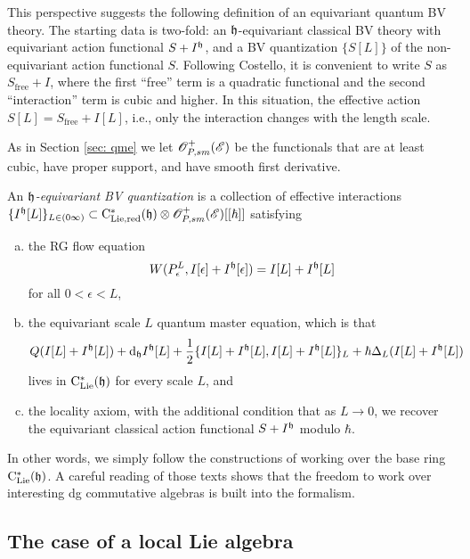 This perspective suggests the following definition of an equivariant quantum BV theory.
The starting data is two-fold:
an $\mathfrak h$-equivariant classical BV theory with equivariant action functional $S+I^\mathfrak h$, 
and a BV quantization $\{S[L]\}$ of the non-equivariant action functional $S$.
Following Costello, it is convenient to write $S$ as $S_{\text{free}} + I$, 
where the first ``free'' term is a quadratic functional and the second ``interaction'' term is cubic and higher.
In this situation, the effective action $S[L] = S_{\text{free}} + I[L]$, 
i.e., only the interaction changes with the length scale.

As in Section \ref{sec: qme} we let $\mathscr O_{P,sm}^+(\mathscr E)$ be the functionals that are at least cubic, have proper support, and have smooth first derivative. 

\begin{dfn} \label{eqQFT} 
An {\em $\mathfrak h$-equivariant BV quantization} is a collection of effective interactions $\{I^\mathfrak h[L]\}_{L \in (0\infty)} \subset {\rm C}_{\rm Lie, red}^*(\mathfrak h) \otimes \mathscr O_{P,sm}^+(\mathscr E)[[\hbar]]$
satisfying
\begin{enumerate}[(a)]
\item the RG flow equation
\[
W(P_\epsilon^L, I[\epsilon]+I^\mathfrak h[\epsilon]) = I[L] + I^\mathfrak h[L]
\]
for all $0 < \epsilon < L$,
\item the equivariant scale $L$ quantum master equation, which is that
\[
Q(I[L]+I^\mathfrak h[L]) + {\rm d}_\mathfrak h I^\mathfrak h[L] + \frac{1}{2}\{I[L]+I^\mathfrak h[L],I[L]+I^\mathfrak h[L]\}_{L} + \hbar \Delta_L(I[L]+I^\mathfrak h[L])
\]
lives in ${\rm C}_{{\rm Lie}}^*(\mathfrak h)$ for every scale $L$, and
\item the locality axiom, with the additional condition that as $L \to 0$, we recover the equivariant classical action functional $S+ I^\mathfrak h$ modulo $\hbar$.
\end{enumerate}
\end{dfn}

In other words, we simply follow the constructions of \cite{CostelloRenormalization} working over the base ring ${\rm C}_{{\rm Lie}}^*(\mathfrak h)$.
A careful reading of those texts shows that the freedom to work over interesting dg commutative algebras is built into the formalism.

\subsection{The case of a local Lie algebra}\label{sec: local equiv}

